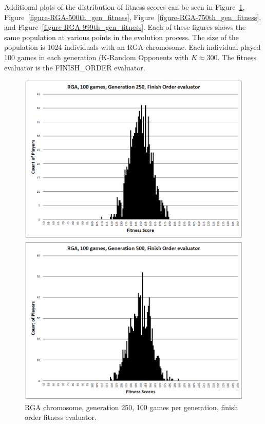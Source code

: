 Additional plots of the distribution of fitness scores can be seen in
Figure~\ref{figure-RGA-250th_gen_fitness},
Figure~\ref{figure-RGA-500th_gen_fitness},
Figure~\ref{figure-RGA-750th_gen_fitness}, and
Figure~\ref{figure-RGA-999th_gen_fitness}. Each of these figures shows the same
population at various points in the evolution process. The size of the
population is 1024 individuals with an RGA chromosome. Each individual played
100 games in each generation (K-Random Opponents with \(K\approx300\). The
fitness evaluator is the FINISH\_ORDER evaluator.

\begin{figure}
\centering
\begin{minipage}[t]{0.47\linewidth}
\centering
\includegraphics[width=1.0\linewidth]{Figures/RGA_1024_G250_N100_FO.png}
\caption[RGA Fitness Distribution, 250th Generation]{RGA chromosome, generation
250, 100 games per generation, finish order fitness evaluator.} \label{figure-RGA-250th_gen_fitness}
\end{minipage}%
\hspace{0.06\linewidth}%
\begin{minipage}[t]{0.47\linewidth}
\centering
\includegraphics[width=1.0\linewidth]{Figures/RGA_1024_G500_N100_FO.png}

\end{minipage}
\end{figure}
